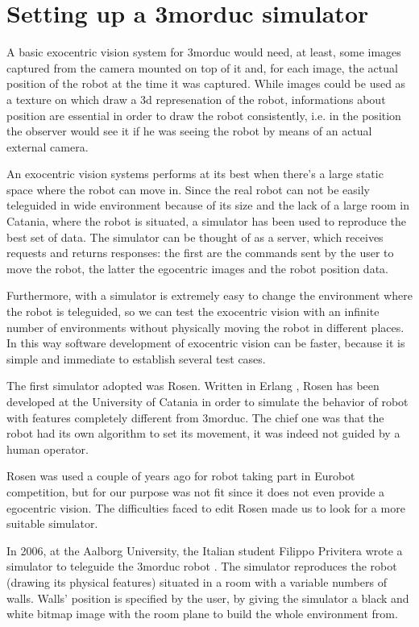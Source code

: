 \section{Setting up a 3morduc simulator}
\label{sec:simulator}
A basic exocentric vision system for 3morduc would need, 
at least, some images captured from the camera mounted 
on top of it and, for each image, the actual position of 
the robot at the time it was captured.
%
While images could be used as a texture on which draw 
a 3d represenation of the robot, informations about 
position are essential in order to draw the robot 
consistently, i.e. in the position the observer would 
see it if he was seeing the robot by means of an actual 
external camera.
%

%
An exocentric vision systems performs at its best 
when there's a large static space where the robot can move in. Since 
the real robot can not be easily teleguided in wide 
environment because of its size and the lack of a large 
room in Catania, where the robot is situated, a simulator 
has been used to reproduce the best set of data. The 
simulator can be thought of as a server, which receives 
requests and returns responses: the first are the commands 
sent by the user to move the robot, the latter the 
egocentric images and the robot position data.
%

%
Furthermore, with a simulator is extremely easy to 
change the environment where the robot is teleguided, 
so we can test the exocentric vision with an infinite 
number of environments without physically moving the 
robot in different places. In this way software 
development of exocentric vision can be faster, because 
it is simple and immediate to establish several test cases.
%

%
The first simulator adopted was Rosen\cite{rosen}. Written in 
Erlang \cite{erlang}, Rosen has been developed at the University
of Catania in order to simulate the behavior of robot with 
features completely different from 3morduc. The chief one 
was that the robot had its own algorithm to set its movement, 
it was indeed not guided by a human operator. 
%

%
Rosen was used a couple of years ago for robot taking part 
in Eurobot competition\cite{eurobot},
but for our purpose was not fit since it does not even 
provide a egocentric vision. The difficulties faced to edit 
Rosen made us to look for a more suitable simulator.
%

%
In 2006, at the Aalborg University, the Italian student Filippo 
Privitera wrote a simulator to teleguide the 3morduc robot 
\cite{privitera}. The simulator reproduces the robot (drawing its 
physical features) situated in a room with a variable numbers 
of walls. Walls' position is specified by the user, by giving 
the simulator a black and white bitmap image with the room 
plane to build the whole environment from. 
%

